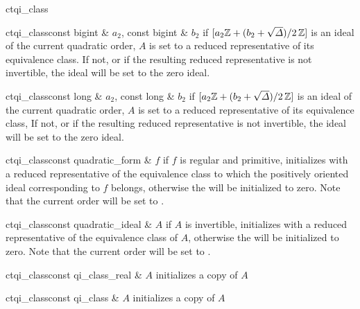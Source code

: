 
\CONS

\begin{fcode}{ct}{qi_class}{}
\end{fcode}

\begin{fcode}{ct}{qi_class}{const bigint & $a_2$, const bigint & $b_2$}
  if $[a_2\mathbb{Z} + (b_2 + \sqrt{\varDelta})/2 \, \mathbb{Z} ]$ is an ideal of the current quadratic order,
  $A$ is set to a reduced representative of its equivalence class.  If not, or if the resulting
  reduced representative is not invertible, the ideal will be set to the zero ideal.
\end{fcode}

\begin{fcode}{ct}{qi_class}{const long & $a_2$, const long & $b_2$}
  if $[a_2\mathbb{Z} + (b_2 + \sqrt{\varDelta})/2 \, \mathbb{Z} ]$ is an ideal of the current quadratic order,
  $A$ is set to a reduced representative of its equivalence class, If not, or if the resulting
  reduced representative is not invertible, the ideal will be set to the zero ideal.
\end{fcode}

\begin{fcode}{ct}{qi_class}{const quadratic_form & $f$}
  if $f$ is regular and primitive, initializes with a reduced representative of the equivalence
  class to which the positively oriented ideal corresponding to $f$ belongs, otherwise the
   will be initialized to zero.  Note that the current order will be set to
  .
\end{fcode}

\begin{fcode}{ct}{qi_class}{const quadratic_ideal & $A$}
  if $A$ is invertible, initializes with a reduced representative of the equivalence class of
  $A$, otherwise the  will be initialized to zero.  Note that the current order
  will be set to .
\end{fcode}

\begin{fcode}{ct}{qi_class}{const qi_class_real & $A$}
  initializes a copy of $A$
\end{fcode}

\begin{fcode}{ct}{qi_class}{const qi_class & $A$}
  initializes a copy of $A$
\end{fcode}

